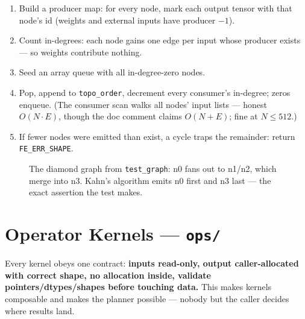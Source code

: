 \documentclass[11pt,a4paper]{article}
\begin{document}
\begin{enumerate}[itemsep=2pt]
\item Build a producer map: for every node, mark each output tensor with that
      node's id (weights and external inputs have producer $-1$).
\item Count in-degrees: each node gains one edge per input whose producer
      exists --- so weights contribute nothing.
\item Seed an array queue with all in-degree-zero nodes.
\item Pop, append to \texttt{topo\_order}, decrement every consumer's in-degree;
      zeros enqueue. (The consumer scan walks all nodes' input lists --- honest
      $O(N \cdot E)$, though the doc comment claims $O(N+E)$; fine at $N \le 512$.)
\item If fewer nodes were emitted than exist, a cycle traps the remainder:
      return \texttt{FE\_ERR\_SHAPE}.
\end{enumerate}

\begin{figure}[h]
\centering
{}
\caption{The diamond graph from \texttt{test\_graph}: n0 fans out to n1/n2,
which merge into n3. Kahn's algorithm emits n0 first and n3 last --- the exact
assertion the test makes.}
\label{fig:diamond}
\end{figure}

\section{Operator Kernels --- \texttt{ops/}}

Every kernel obeys one contract: \textbf{inputs read-only, output
caller-allocated with correct shape, no allocation inside, validate
pointers/dtypes/shapes before touching data.} This makes kernels composable and
makes the planner possible --- nobody but the caller decides where results land.
\end{document}
